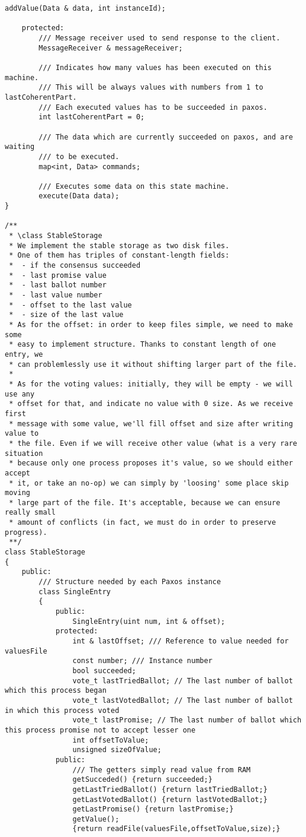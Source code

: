 {\begin{lstlisting}[frame=lines,caption=Pseudocode of Paxos algorithm]
		addValue(Data & data, int instanceId);
		
	protected:
		/// Message receiver used to send response to the client.
		MessageReceiver & messageReceiver;
		
		/// Indicates how many values has been executed on this machine.
		/// This will be always values with numbers from 1 to lastCoherentPart.
		/// Each executed values has to be succeeded in paxos.
		int lastCoherentPart = 0;
		
		/// The data which are currently succeeded on paxos, and are waiting 
		/// to be executed.
		map<int, Data> commands;
		
		/// Executes some data on this state machine.
		execute(Data data);
}

/**
 * \class StableStorage
 * We implement the stable storage as two disk files.
 * One of them has triples of constant-length fields:
 *  - if the consensus succeeded
 *  - last promise value
 *  - last ballot number
 *  - last value number
 *  - offset to the last value
 *  - size of the last value
 * As for the offset: in order to keep files simple, we need to make some
 * easy to implement structure. Thanks to constant length of one entry, we
 * can problemlessly use it without shifting larger part of the file.
 *
 * As for the voting values: initially, they will be empty - we will use any
 * offset for that, and indicate no value with 0 size. As we receive first
 * message with some value, we'll fill offset and size after writing value to
 * the file. Even if we will receive other value (what is a very rare situation
 * because only one process proposes it's value, so we should either accept
 * it, or take an no-op) we can simply by 'loosing' some place skip moving
 * large part of the file. It's acceptable, because we can ensure really small
 * amount of conflicts (in fact, we must do in order to preserve progress).
 **/
class StableStorage
{
	public:
		/// Structure needed by each Paxos instance
		class SingleEntry
		{
			public:
				SingleEntry(uint num, int & offset);
			protected:
				int & lastOffset; /// Reference to value needed for valuesFile
				const number; /// Instance number
				bool succeeded;
				vote_t lastTriedBallot; // The last number of ballot which this process began
				vote_t lastVotedBallot; // The last number of ballot in which this process voted
				vote_t lastPromise; // The last number of ballot which this process promise not to accept lesser one
				int offsetToValue;
				unsigned sizeOfValue;
			public:
				/// The getters simply read value from RAM
				getSucceded() {return succeeded;}
				getLastTriedBallot() {return lastTriedBallot;}
				getLastVotedBallot() {return lastVotedBallot;}
				getLastPromise() {return lastPromise;}
				getValue();
				{return readFile(valuesFile,offsetToValue,size);}


\end{lstlisting}}
